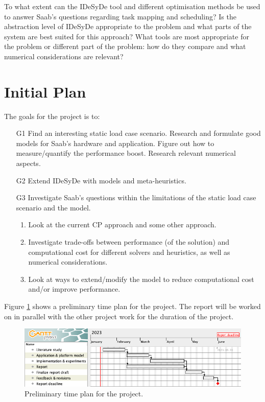\documentclass[12pt,notitlepage]{article}
\begin{document}
To what extent can the IDeSyDe tool and different optimisation methods be used to answer Saab's questions regarding task mapping and scheduling? Is the abstraction level of IDeSyDe appropriate to the problem and what parts of the system are best suited for this approach? What tools are most appropriate for the problem or different part of the problem: how do they compare and what numerical considerations are relevant?

\section{Initial Plan}
The goals for the project is to:
\begin{enumerate}
	\item[G1] Find an interesting static load case scenario. Research and formulate good models for Saab's hardware and application. Figure out how to measure/quantify the performance boost. Research relevant numerical aspects.
	\item[G2] Extend IDeSyDe with models and meta-heuristics.
	\item[G3] Investigate Saab's questions within the limitations of the static load case scenario and the model.
	\begin{enumerate}
		\item Look at the current CP approach and some other approach.
		\item Investigate trade-offs between performance (of the solution) and computational cost for different solvers and heuristics, as well as numerical considerations.
		\item Look at ways to extend/modify the model to reduce computational cost and/or improve performance.
	\end{enumerate}
\end{enumerate}

\noindent Figure \ref{timeplan} shows a preliminary time plan for the project. The report will be worked on in parallel with the other project work for the duration of the project.

\begin{figure}[H]
	\centering
	\includegraphics[scale=0.5]{figures/timeline.png} 
	\caption{Preliminary time plan for the project.}
	\label{timeplan}
\end{figure}
\end{document}
